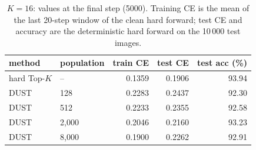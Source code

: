 \begin{table}[H]
\centering
\caption{$K = 16$: values at the final step (5000). Training CE is the mean of the last 20-step window of the clean hard forward; test CE and accuracy are the deterministic hard forward on the 10\,000 test images.}
\label{tab:k16}
\begin{tabular}{llrrr}
\toprule
    method & population & train CE & test CE & test acc (\%) \\
\midrule
    hard Top-$K$ & -- & 0.1359 & 0.1906 & 93.94 \\
    DUST & 128 & 0.2283 & 0.2437 & 92.30 \\
    DUST & 512 & 0.2233 & 0.2355 & 92.58 \\
    DUST & 2,000 & 0.2046 & 0.2160 & 93.23 \\
    DUST & 8,000 & 0.1900 & 0.2262 & 92.91 \\
\bottomrule
\end{tabular}
\end{table}
